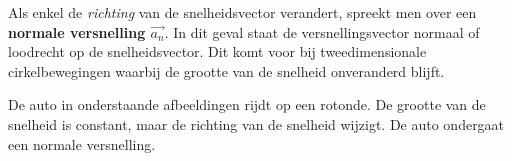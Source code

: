 \documentclass{ximera}
\begin{document}
\begin{definition}
Als enkel de \textit{richting} van de snelheidsvector verandert, spreekt men over een \textbf{normale versnelling \(\vec{a_n}\)}. In dit geval staat de versnellingsvector normaal of loodrecht op de snelheidsvector. Dit komt voor bij tweedimensionale cirkelbewegingen waarbij de grootte van de snelheid onveranderd blijft.
\end{definition}

\begin{example}
De auto in onderstaande afbeeldingen rijdt op een rotonde. De grootte van de snelheid is constant, maar de richting van de snelheid wijzigt. 
De auto ondergaat een normale versnelling. 

\begin{image}
	
\end{image}
\end{example}
\end{document}
